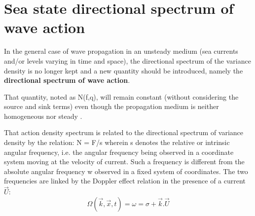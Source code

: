 \section{ Sea state directional spectrum of wave action}

 In the general case of wave propagation in an unsteady medium (sea currents and/or levels varying in time and space), the directional spectrum of the variance density is no longer kept and a new quantity should be introduced, namely the \textbf{directional spectrum of wave action}.

 That quantity, noted as N(f,q), will remain constant (without considering the source and sink terms) even though the propagation medium is neither homogeneous nor steady \cite{Komen1994} \cite{Willebrand1975} \cite{Phillips1977} \cite{Bretherton1969}.

 That action density spectrum is related to the directional spectrum of variance density by the relation:
\bequ
 \label{GrindEQ__2_15_}
N = F/s
\eequ
 wherein s denotes the relative or intrinsic angular frequency, i.e. the angular frequency being observed in a coordinate system moving at the velocity of current. Such a frequency is different from the absolute angular frequency w observed in a fixed system of coordinates. The two frequencies are linked by the Doppler effect relation in the presence of a current $\vec{U}$:
\begin{equation} \label{GrindEQ__2_16_}
\Omega (\vec{k},\vec{x},t)=\omega =\sigma +\vec{k}.\vec{U}
\end{equation}


